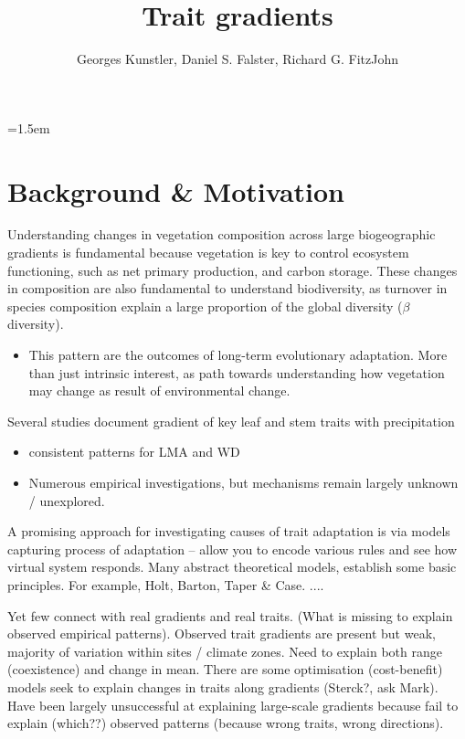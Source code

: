 \documentclass[a4paper,11pt]{article}
\title{Trait gradients}
\author{ Georges Kunstler, Daniel S. Falster, Richard G. FitzJohn}
\date{}
\affiliation{Department of Biological Sciences, Macquarie University,
  Sydney, Australia}
\begin{document}
\mstitleshort
\parindent=1.5em
\addtolength{\parskip}{.3em}


\section{Background \& Motivation}

Understanding changes in vegetation composition across large biogeographic gradients is fundamental because vegetation is key to control ecosystem functioning, such as net primary production, and carbon storage. These changes in composition are also fundamental to understand biodiversity, as turnover in species composition explain a large proportion of the global diversity ($\beta$ diversity).

\begin{itemize}
\item This pattern are the outcomes of long-term evolutionary adaptation. More than just intrinsic interest, as path towards understanding how vegetation may change as result of environmental change.
\end{itemize}

Several studies document gradient of key leaf and stem traits with precipitation

\begin{itemize}
\item consistent patterns for LMA and WD
\item Numerous empirical investigations, but mechanisms remain largely unknown / unexplored.
\end{itemize}

A promising approach for investigating causes of trait adaptation is via models capturing process of adaptation -- allow you to encode various rules and see how virtual system responds. Many abstract theoretical models, establish some basic principles. For example, Holt, Barton, Taper \& Case. ....

Yet few connect with real gradients and real traits. (What is missing to explain observed empirical patterns). Observed trait gradients are present but weak, majority of variation within sites / climate zones. Need to explain both range (coexistence) and change in mean. There are some optimisation (cost-benefit) models seek to explain changes in traits along gradients  (Sterck?, ask Mark). Have been largely unsuccessful at explaining large-scale gradients because fail to explain (which??) observed patterns (because wrong traits, wrong directions).
\end{document}
